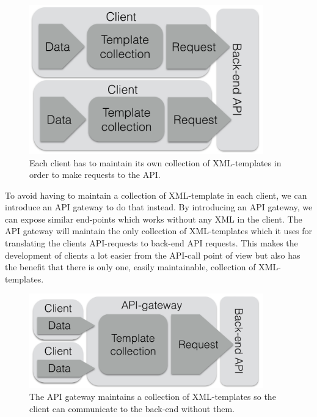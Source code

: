 \documentclass{cslthse-msc}
\begin{document}
\begin{figure}[H]
  \centering
    \begin{center}
      \includegraphics[width=0.9\textwidth]{images/client_templates.png}
    \end{center}
  \caption{Each client has to maintain its own collection of XML-templates in order to make requests to the API.}
\end{figure}

To avoid having to maintain a collection of XML-template in each client, we can introduce an API gateway to do that instead. By introducing an API gateway, we can expose similar end-points which works without any XML in the client. The API gateway will maintain the only collection of XML-templates which it uses for translating the clients API-requests to back-end API requests. This makes the development of clients a lot easier from the API-call point of view but also has the benefit that there is only one, easily maintainable, collection of XML-templates.

\begin{figure}[H]
  \centering
    \begin{center}
      \includegraphics[width=0.9\textwidth]{images/gateway_templates.png}
    \end{center}
  \caption{The API gateway maintains a collection of XML-templates so the client can communicate to the back-end without them.}
\end{figure}
\end{document}

